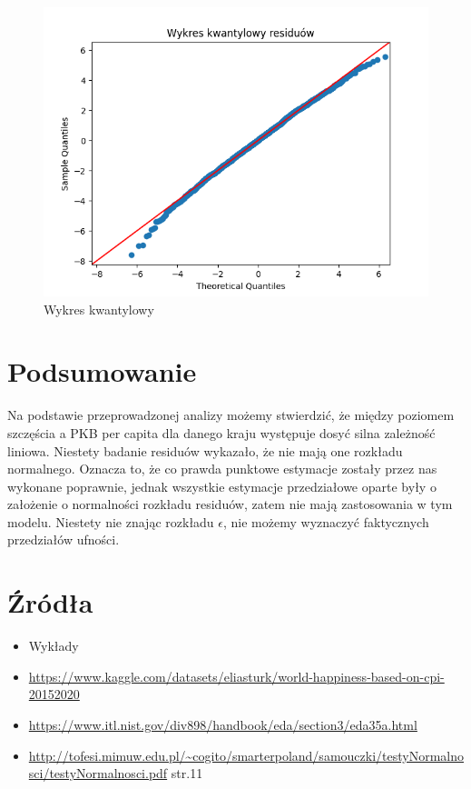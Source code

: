 \documentclass{article}
\theoremstyle{break}
\begin{document}
\begin{figure}[H]
	\begin{center}
		\includegraphics[scale=0.63]{res_qq.png}
		\caption{Wykres kwantylowy}
		\label{fig:res_qq}
	\end{center}
\end{figure}

	\section{Podsumowanie}
	
	Na podstawie przeprowadzonej analizy możemy stwierdzić, że między poziomem szczęścia a PKB per capita dla danego kraju występuje dosyć silna zależność liniowa. Niestety badanie residuów wykazało, że nie mają one rozkładu normalnego. Oznacza to, że co prawda punktowe estymacje zostały przez nas wykonane poprawnie, jednak wszystkie estymacje przedziałowe oparte były o założenie o normalności rozkładu residuów, zatem nie mają zastosowania w tym modelu. Niestety nie znając rozkładu $\epsilon$, nie możemy wyznaczyć faktycznych przedziałów ufności.
	
	\section{Źródła}
	\begin{itemize}
		\item Wykłady
		\item \url{https://www.kaggle.com/datasets/eliasturk/world-happiness-based-on-cpi-20152020}
		\item \url{https://www.itl.nist.gov/div898/handbook/eda/section3/eda35a.html}
		\item \url{http://tofesi.mimuw.edu.pl/~cogito/smarterpoland/samouczki/testyNormalnosci/testyNormalnosci.pdf} str.11
		
	\end{itemize}
	
	
\end{document}
